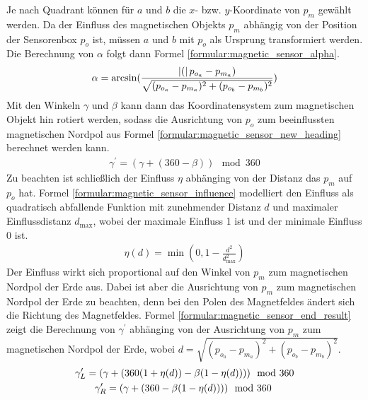 Je nach Quadrant können für $a$ und $b$ die $x$- bzw. $y$-Koordinate von $p_{m}$ gewählt werden.
Da der Einfluss des magnetischen Objekts $p_{m}$ abhängig von der Position der Sensorenbox $p_{o}$ ist,
müssen $a$ und $b$ mit $p_{o}$ als Ursprung transformiert werden.
Die Berechnung von $\alpha$ folgt dann Formel \ref{formular:magnetic_sensor_alpha}.
\begin{align}
    \label{formular:magnetic_sensor_alpha}
    \alpha = \arcsin (\frac{\left|{(}\right|p_{o_a} - p_{m_a})}{\sqrt{(p_{o_a} - p_{m_a})^2 + (p_{o_b} - p_{m_b})^2}})
\end{align}
Mit den Winkeln $\gamma$ und $\beta$ kann dann das Koordinatensystem zum magnetischen Objekt hin rotiert werden,
sodass die Ausrichtung von $p_{o}$ zum beeinflussten magnetischen Nordpol aus Formel \ref{formular:magnetic_sensor_new_heading} berechnet werden kann.
\begin{align}
    \label{formular:magnetic_sensor_new_heading}
    \gamma^{\prime} = (\gamma + (360 - \beta))\mod 360
\end{align}
Zu beachten ist schließlich der Einfluss $\eta$ abhänging von der Distanz das $p_{m}$ auf $p_{o}$ hat.
Formel \ref{formular:magnetic_sensor_influence} modelliert den Einfluss als quadratisch abfallende Funktion mit zunehmender Distanz $d$ und maximaler Einflussdistanz $d_{\max}$,
wobei der maximale Einfluss 1 ist und der minimale Einfluss 0 ist.
\begin{align}
    \label{formular:magnetic_sensor_influence}
    \eta(d) = \min(0, 1 - \frac{d^2}{d_{\max}^2})
\end{align}
Der Einfluss wirkt sich proportional auf den Winkel von $p_{m}$ zum magnetischen Nordpol der Erde aus.
Dabei ist aber die Ausrichtung von $p_{m}$ zum magnetischen Nordpol der Erde zu beachten, denn bei den Polen des Magnetfeldes ändert sich die Richtung des Magnetfeldes.
Formel \ref{formular:magnetic_sensor_end_result} zeigt die Berechnung von $\gamma^{\prime}$ abhänging von der Ausrichtung von $p_{m}$ zum magnetischen Nordpol der Erde,
wobei $d = \sqrt{(p_{o_a} - p_{m_a})^2 + (p_{o_b} - p_{m_b})^2}$.
\begin{align}
    \label{formular:magnetic_sensor_end_result}
    \gamma^{\prime}_L = (\gamma + (360(1 + \eta(d)) - \beta(1 - \eta(d))))\mod 360 \\\nonumber
    \gamma^{\prime}_R = (\gamma + (360 - \beta(1 - \eta(d))))\mod 360 \hspace{0.8cm}
\end{align}

